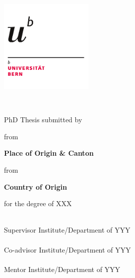 \documentclass[
10pt, %
english, %
singlespacing, %
headsepline, %
]{MastersDoctoralThesis} %
\author{\textsc{Lejeune} Laurent} %
\begin{document}
\frontmatter %

\pagestyle{plain} %


\begin{titlepage}

\hfill{\includegraphics[width=4.5cm]{Logo-unibe}}

\begin{center}

\vspace*{0.5cm}
{\Large \facname \\ \textsc{\univname} \par}\vspace{1cm} %

{\huge \bfseries \ttitle\par}\vspace{1cm} %
\large{PhD Thesis submitted by}\vspace{0.5cm}

{\Large \bfseries \authorname \par}\vspace{0.5cm}

\large{from }{\Large \bfseries Place of Origin \& Canton \par}\vspace{0.5cm}

\large{from }{\Large \bfseries Country of Origin \par}\vspace{0.5cm}

\large{for the degree of XXX}\vspace{0.5cm}
 
\vfill

\large{\supname \\ Supervisor Institute/Department of YYY \\}\vspace{0.5cm}
\large{\examname \\  Co-advisor Institute/Department of YYY \\}\vspace{0.5cm}
\large{\mentname \\  Mentor Institute/Department of YYY}\vspace{0.5cm}


\end{center}
\end{titlepage}
\end{document}
